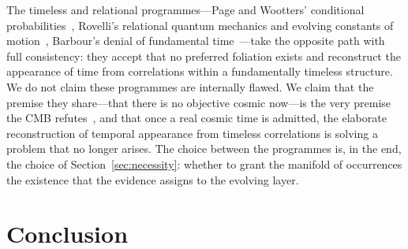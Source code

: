 \documentclass[11pt,a4paper]{article}
\theoremstyle{plain}
\theoremstyle{definition}
\theoremstyle{remark}
\begin{document}
The timeless and relational programmes---Page and Wootters' conditional probabilities~\cite{PageWootters1983}, Rovelli's relational quantum mechanics and evolving constants of motion~\cite{Rovelli2004}, Barbour's denial of fundamental time~\cite{BarbourEnd}---take the opposite path with full consistency: they accept that no preferred foliation exists and reconstruct the appearance of time from correlations within a fundamentally timeless structure. We do not claim these programmes are internally flawed. We claim that the premise they share---that there is no objective cosmic now---is the very premise the CMB refutes~\cite{JanzenModernParallax}, and that once a real cosmic time is admitted, the elaborate reconstruction of temporal appearance from timeless correlations is solving a problem that no longer arises. The choice between the programmes is, in the end, the choice of Section~\ref{sec:necessity}: whether to grant the manifold of occurrences the existence that the evidence assigns to the evolving layer.

\section{Conclusion}\label{sec:conclusion}
\end{document}
